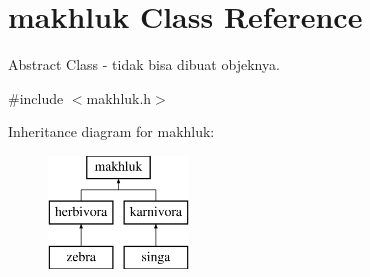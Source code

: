 \hypertarget{classmakhluk}{}\section{makhluk Class Reference}
\label{classmakhluk}


Abstract Class -\/ tidak bisa dibuat objeknya.  




{\ttfamily \#include $<$makhluk.\+h$>$}

Inheritance diagram for makhluk\+:\begin{figure}[H]
\begin{center}
\leavevmode
\includegraphics[height=3.000000cm]{classmakhluk}
\end{center}
\end{figure}
